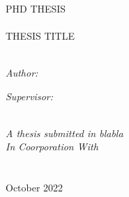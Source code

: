 \documentclass[12pt, twoside, openright]{Thesis}
\begin{document}
\begin{titlepage}
\begin{center}

\textsc{\LARGE \univname}\\[1.5cm] %
\textsc{\Large PHD THESIS}\\[0.5cm] %

\HRule \\[0.4cm] %
{\huge \textsc{THESIS TITLE}}\\ %
\HRule \\[1.5cm] %
 
\begin{minipage}{0.4\textwidth}
\begin{flushleft} \large
\emph{Author:}\\
{\authornames} %
\end{flushleft}
\end{minipage}
\begin{minipage}{0.5\textwidth}
\begin{flushright} \large
\emph{Supervisor: } \\
\href{https://www.iwr.uni-heidelberg.de/groups/compchem/}{\supname}
\end{flushright}
\end{minipage}\\[3cm]
 
\large \textit{A thesis submitted in blabla}\\[0.3cm] %
\textit{In Coorporation With }\\[0.4cm]
\groupname\\\deptname\\[2cm] %
 
{\large October 2022}\\[4cm] %
 
\vfill
\end{center}
\end{titlepage}
\end{document}
